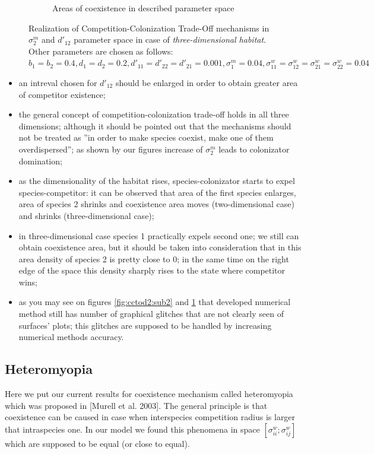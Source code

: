 \documentclass[%
 aip,
rsi,%
 amsmath,amssymb,
 reprint,%
]{revtex4-1}
\begin{document}
\begin{figure}
\begin{subfigure}{.5\textwidth}
  \caption{Areas of coexistence in described parameter space}
  \label{fig:cctod3:sub2}
\end{subfigure}
\caption{Realization of Competition-Colonization Trade-Off mechanisms in $\sigma^m_2$ and $d'_{12}$ parameter space in case of \emph{three-dimensional habitat}. Other parameters are chosen as follows:  $b_{1}=b_{2}=0.4
		, d_{1}=d_{2}=0.2
		, d'_{11}=d'_{22}=d'_{21}=0.001,
		\sigma_{1}^{m}=0.04
            , \sigma_{11}^{w}=\sigma_{12}^{w}=\sigma_{21}^{w}=\sigma_{22}^{w}=0.04$}
\label{fig:cctod3}
\end{figure}


\begin{itemize}
    \item an intreval chosen for \(d'_{12}\) should be enlarged in order to obtain greater area of competitor existence;
    \item the general concept of competition-colonization trade-off holds in all three dimensions; although it should be pointed out that the mechanisms should not be treated as ''in order to make species coexist, make one of them overdispersed''; as shown by our figures increase of \( \sigma^m_2 \) leads to colonizator domination;
    \item as the dimensionality of the habitat rises, species-colonizator starts to expel species-competitor: it can be observed that area of the first species enlarges, area of species 2 shrinks and coexistence area moves (two-dimensional case) and shrinks (three-dimensional case);
    \item in three-dimensional case species 1 practically expels second one; we still can obtain coexistence area, but it should be taken into consideration that in this area density of species 2 is pretty close to 0; in the same time on the right edge of the space this density sharply rises to the state where competitor wins;
    \item as you may see on figures \ref{fig:cctod2:sub2} and \ref{fig:cctod3:sub2} that developed numerical method still has number of graphical glitches that are not clearly seen of surfaces' plots; this glitches are supposed to be handled by increasing numerical methods accuracy.
\end{itemize}

\subsection{Heteromyopia}

Here we put our current results for coexistence mechanism called heteromyopia which was proposed in [Murell et al. 2003]. The general principle is that coexistence can be caused in case when interspecies competition radius is larger that intraspecies one. In our model we found this phenomena in space $\left[ \sigma^w_{ii}; \sigma^w_{ij} \right] $ which are supposed to be equal (or close to equal).
\end{document}
